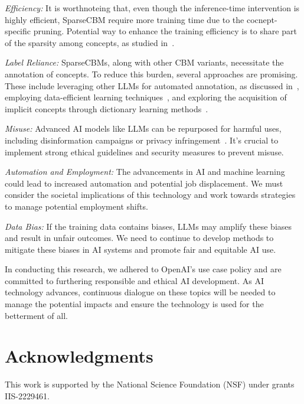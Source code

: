 \documentclass[letterpaper]{article} %
\begin{document}
\textit{Efficiency:} It is worthnoteing that, even though the inference-time intervention is highly efficient, SparseCBM require more training time due to the cocnept-specific pruning. Potential way to enhance the training efficiency is to share part of the sparsity among concepts, as studied in~\citep{wang2020learn,chen2021long}.

\textit{Label Reliance:} SparseCBMs, along with other CBM variants, necessitate the annotation of concepts. To reduce this burden, several approaches are promising. These include leveraging other LLMs for automated annotation, as discussed in~\citep{tan2023cbm,wang2023contrastive}, employing data-efficient learning techniques~\citep{tan2022graph}, and exploring the acquisition of implicit concepts through dictionary learning methods~\citep{wang2022neural}.


\textit{Misuse:} Advanced AI models like LLMs can be repurposed for harmful uses, including disinformation campaigns or privacy infringement~\cite{jiang2023disinformation,chen2023combating}. It's crucial to implement strong ethical guidelines and security measures to prevent misuse.

\textit{Automation and Employment:} The advancements in AI and machine learning could lead to increased automation and potential job displacement. We must consider the societal implications of this technology and work towards strategies to manage potential employment shifts.

\textit{Data Bias:} If the training data contains biases, LLMs may amplify these biases and result in unfair outcomes. We need to continue to develop methods to mitigate these biases in AI systems and promote fair and equitable AI use.

In conducting this research, we adhered to OpenAI's use case policy and are committed to furthering responsible and ethical AI development. As AI technology advances, continuous dialogue on these topics will be needed to manage the potential impacts and ensure the technology is used for the betterment of all.

\section*{Acknowledgments}
This work is supported by the National Science Foundation (NSF) under grants IIS-2229461.

\end{document}
